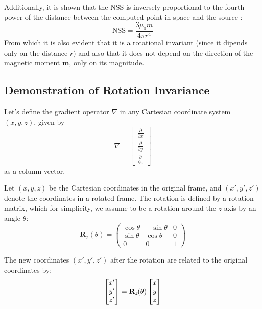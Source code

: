 Additionally, it is shown that the NSS is inversely proportional to the fourth power of 
the distance between the computed point in space and the source \cite{NSS_single_localization}:
\begin{equation}
\text{NSS} = \frac{3 \mu_0 m}{4 \pi r^4}
\label{eq:NSS_decay}
\end{equation}
From which it is also evident that it is a rotational invariant (since it dipends
only on the distance $r$) and also that it does not depend on the direction of the magnetic
moment $\mathbf{m}$, only on its magnitude.
\\

\noindent
\subsection{Demonstration of Rotation Invariance}
\label{invariance}

\noindent
Let's define the gradient operator $\nabla$ in any Cartesian  
coordinate system $(x, y, z)$, given by 
\begin{equation}
\nabla = 
\begin{bmatrix} 
\frac{\partial}{\partial x} \\ 
\frac{\partial}{\partial y} \\
\frac{\partial}{\partial z}
\end{bmatrix}
\label{eq:nabla}
\end{equation}
as a column vector.

\noindent
Let \( (x, y, z) \) be the Cartesian coordinates in the original frame, 
and \( (x', y', z') \) denote the coordinates in a rotated frame. 
The rotation is defined by a rotation matrix, which for simplicity, 
we assume to be a rotation around the \( z \)-axis by an angle \( \theta \):
\[
\mathbf{R}_z(\theta) = 
\begin{pmatrix}
\cos \theta & -\sin \theta & 0 \\
\sin \theta & \cos \theta & 0 \\
0 & 0 & 1
\end{pmatrix}
\]

\noindent
The new coordinates $(x', y', z')$ after the rotation are related to 
the original coordinates by:
\[
\begin{bmatrix} 
x' \\ 
y' \\
z'
\end{bmatrix} 
= 
\mathbf{R}_z\mkern-2mu(\theta)
\begin{bmatrix} 
x \\ 
y \\
z
\end{bmatrix}
\]

